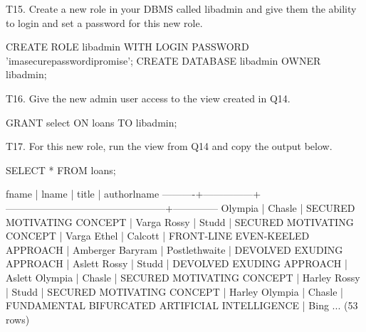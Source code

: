 T15. Create a new role in your DBMS called libadmin and give them the ability to login and set a password for this new role.

\begin{sql}
CREATE ROLE libadmin WITH LOGIN PASSWORD 'imasecurepasswordipromise';
CREATE DATABASE libadmin OWNER libadmin;
\end{sql}

T16. Give the new admin user access to the view created in Q14.
\begin{sql}
GRANT select
ON loans
TO libadmin;
\end{sql}

T17. For this new role, run the view from Q14 and copy the output below.

\begin{sql}
SELECT * FROM loans;
\end{sql}
\begin{pseudo}
  fname   |     lname     |                     title                      | authorlname
----------+---------------+------------------------------------------------+--------------
 Olympia  | Chasle        | SECURED MOTIVATING CONCEPT                     | Varga
 Rossy    | Studd         | SECURED MOTIVATING CONCEPT                     | Varga
 Ethel    | Calcott       | FRONT-LINE EVEN-KEELED APPROACH                | Amberger
 Baryram  | Postlethwaite | DEVOLVED EXUDING APPROACH                      | Aslett
 Rossy    | Studd         | DEVOLVED EXUDING APPROACH                      | Aslett
 Olympia  | Chasle        | SECURED MOTIVATING CONCEPT                     | Harley
 Rossy    | Studd         | SECURED MOTIVATING CONCEPT                     | Harley
 Olympia  | Chasle        | FUNDAMENTAL BIFURCATED ARTIFICIAL INTELLIGENCE | Bing
...
(53 rows)
\end{pseudo}
